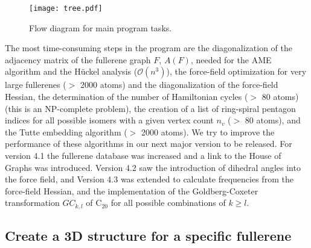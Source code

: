 \documentclass[article,a4paper,twoside]{memoir}
\newcommand{\C}[1]{\ensuremath{\mathrm{C}_{#1}}}
\begin{document}
\begin{figure}[htbp]
   	\centering
	\texttt{[image: tree.pdf]} 
    \caption{Flow diagram for main program tasks.}
    \label{pic:flowdiagram}
\end{figure}

The most time-consuming steps in the program are the diagonalization of the adjacency matrix 
of the fullerene graph $F$, $A(F)$,  
needed for the AME algorithm and the H\"uckel analysis ($\mathcal{O}(n^3)$), the force-field optimization for
very large fullerenes ($>$ 2000 atoms)  and the diagonalization of
the force-field Hessian, the determination of the number of Hamiltonian cycles
($>$ 80 atoms) (this is an NP-complete problem), the creation of a list of ring-spiral pentagon
indices for all possible isomers with a given vertex count $n_v$ ($>$ 80 atoms), 
and the Tutte embedding algorithm ($>$ 2000 atoms). We try to improve the performance of these algorithms
in our next major version to be released. For version 4.1 the fullerene database was increased and a link to
the House of Graphs was introduced. Version 4.2 saw the introduction of dihedral angles into the force field,
and Version 4.3 was extended to calculate frequencies from the force-field Hessian, and the implementation of
the Goldberg-Coxeter transformation $GC_{k,l}$ of \C{20} for all possible combinations of $k \geq l$.

\subsection{Create a 3D structure for a specific fullerene}
\end{document}
